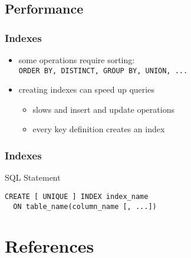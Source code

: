 \documentclass[dvipsnames]{beamer}
\theoremstyle{plain}
\begin{document}
\subsection{Performance}

\begin{frame}
  \frametitle{Indexes}

  \begin{itemize}
    \item some operations require sorting:\\
      \lstinline!ORDER BY, DISTINCT, GROUP BY, UNION, ...!

    \pause
    \item creating indexes can speed up queries
    \begin{itemize}
      \item slows and insert and update operations
      \item every key definition creates an index
    \end{itemize}
  \end{itemize}
\end{frame}

\begin{frame}[fragile]
  \frametitle{Indexes}

  \begin{block}{SQL Statement}
    \begin{lstlisting}[language=ExtendedSQL]
CREATE [ UNIQUE ] INDEX index_name
  ON table_name(column_name [, ...])
    \end{lstlisting}
  \end{block}
\end{frame}

\section*{References}
\end{document}
